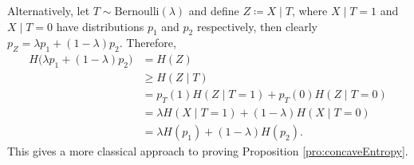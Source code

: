 \documentclass[math, code]{amznotes}
\theoremstyle{remark}
\begin{document}
Alternatively, let $T \sim \mathrm{Bernoulli}\left(\lambda\right)$ and define $Z \coloneqq X \mid T$, where $X \mid T = 1$ and $X \mid T = 0$ have distributions $p_1$ and $p_2$ respectively, then clearly $p_Z = \lambda p_1 + \left(1 - \lambda\right)p_2$. Therefore,
\begin{align*}
    H\bigl(\lambda p_1 + \left(1 - \lambda\right)p_2\bigr) & = H\left(Z\right) \\
    & \geq H\left(Z \mid T\right) \\
    & = p_T\left(1\right)H\left(Z \mid T = 1\right) + p_T\left(0\right)H\left(Z \mid T = 0\right) \\
    & = \lambda H\left(X \mid T = 1\right) + \left(1 - \lambda\right)H\left(X \mid T = 0\right) \\
    & = \lambda H\left(p_1\right) + \left(1 - \lambda\right)H\left(p_2\right).
\end{align*}
This gives a more classical approach to proving Proposition \ref{pro:concaveEntropy}.
\end{document}
